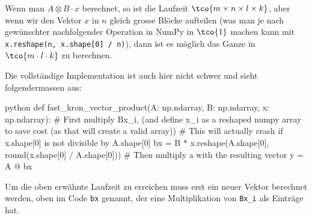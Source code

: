  Wenn man $A \otimes B \cdot x$ berechnet, so ist die Laufzeit $\tco{m \times n \times l \times k}$, aber wenn wir den Vektor $x$ in $n$ gleich grosse Blöcke aufteilen (was man je nach gewünschter nachfolgender Operation in NumPy in $\tco{1}$ machen kann mit \verb|x.reshape(n, x.shape[0] / n)|), dann ist es möglich das Ganze in $\tco{m \cdot l \cdot k}$ zu berechnen. 

Die vollständige Implementation ist auch hier nicht schwer und sieht folgendermassen aus:
\begin{code}{python}
    def fast_kron_vector_product(A: np.ndarray, B: np.ndarray, x: np.ndarray):
        # First multiply Bx_i, (and define x_i as a reshaped numpy array to save cost (as that will create a valid array))
        # This will actually crash if x.shape[0] is not divisible by A.shape[0]
        bx = B * x.reshape(A.shape[0], round(x.shape[0] / A.shape[0]))
        # Then multiply a with the resulting vector
        y = A @ bx
\end{code}

Um die oben erwähnte Laufzeit zu erreichen muss erst ein neuer Vektor berechnet werden, oben im Code \verb|bx| genannt, der eine Multiplikation von \verb|Bx_i| als Einträge hat.
